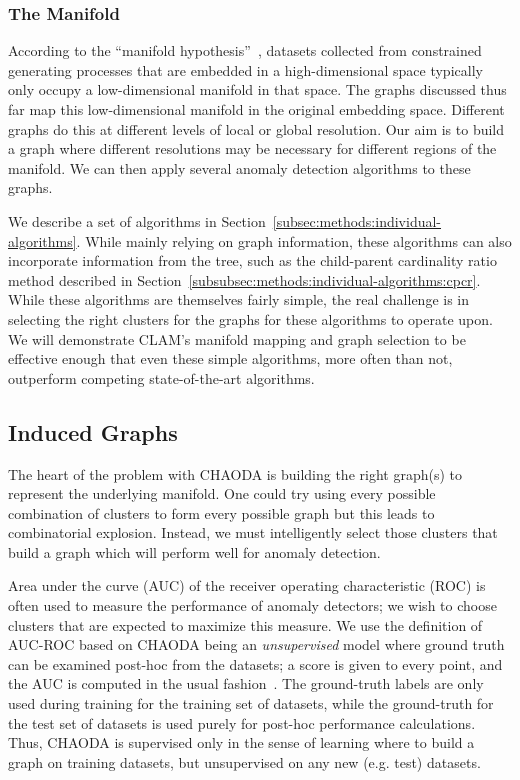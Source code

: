 \subsubsection{The Manifold}
\label{subsubsec:methods:clam:the-manifold}
According to the ``manifold hypothesis''~\cite{fefferman2016testing}, datasets collected from constrained generating processes that are embedded in a high-dimensional space typically only occupy a low-dimensional manifold in that space.
The graphs discussed thus far map this low-dimensional manifold in the original embedding space.
Different graphs do this at different levels of local or global resolution.
Our aim is to build a graph where different resolutions may be necessary for different regions of the manifold.
We can then apply several anomaly detection algorithms to these graphs.

We describe a set of algorithms in Section~\ref{subsec:methods:individual-algorithms}.
While mainly relying on graph information, these algorithms can also incorporate information from the tree, such as the child-parent cardinality ratio method described in Section~\ref{subsubsec:methods:individual-algorithms:cpcr}.
While these algorithms are themselves fairly simple, the real challenge is in selecting the right clusters for the graphs for these algorithms to operate upon.
We will demonstrate CLAM's manifold mapping and graph selection to be effective enough that even these simple algorithms, more often than not, outperform competing state-of-the-art algorithms.


\subsection{Induced Graphs}
\label{subsec:methods:induced-graphs}

The heart of the problem with CHAODA is building the right graph(s) to represent the underlying manifold.
One could try using every possible combination of clusters to form every possible graph but this leads to combinatorial explosion.
Instead, we must intelligently select those clusters that build a graph which will perform well for anomaly detection.

Area under the curve (AUC) of the receiver operating characteristic (ROC) is often used to measure the performance of anomaly detectors;
we wish to choose clusters that are expected to maximize this measure.
We use the definition of AUC-ROC based on CHAODA being an \emph{unsupervised} model where ground truth can be examined post-hoc from the datasets; a score is given to every point, and the AUC is computed in the usual fashion~\cite{fawcett2006introduction}.
The ground-truth labels are only used during training for the training set of datasets, while the ground-truth for the test set of datasets is used purely for post-hoc performance calculations.
Thus, CHAODA is supervised only in the sense of learning where to build a graph on training datasets, but unsupervised on any new (e.g. test) datasets.

